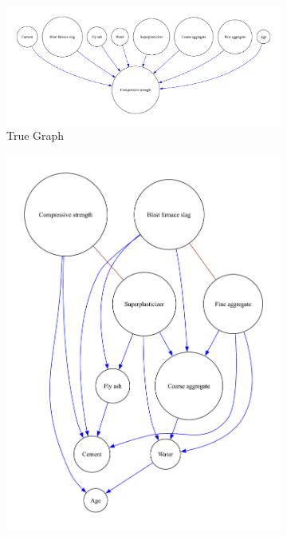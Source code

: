 \documentclass{article}
\begin{document}
\begin{figure}[H]
    \centering
    \begin{subfigure}{0.3\textwidth}
        \centering
        \vspace{-0.5cm}
        \includegraphics[width=\linewidth]{dataset/CCS_Data/output_graph/true_graph.pdf}
        \vfill
        \caption{True Graph}
        \label{fig:sub1}
    \end{subfigure}
    \hspace{0.04\textwidth}
    \begin{subfigure}{0.3\textwidth}
        \centering
        \vspace{-0.5cm}
        \includegraphics[width=\linewidth]{dataset/CCS_Data/output_graph/initial_graph.pdf}

\end{subfigure}
\end{figure}
\end{document}
